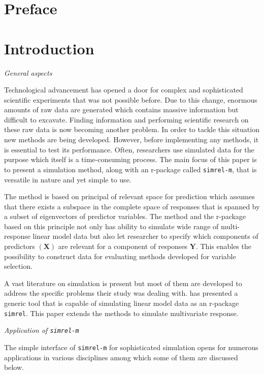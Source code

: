 \documentclass[12pt,a4paperpaper,authoryear]{elsarticle} %
\begin{document}
\section*{Preface}\label{preface}

\section{Introduction}\label{introduction}

\emph{General aspects}

Technological advancement has opened a door for complex and
sophisticated scientific experiments that was not possible before. Due
to this change, enormous amounts of raw data are generated which
contains massive information but difficult to excavate. Finding
information and performing scientific research on these raw data is now
becoming another problem. In order to tackle this situation new methods
are being developed. However, before implementing any methods, it is
essential to test its performance. Often, researchers use simulated data
for the purpose which itself is a time-consuming process. The main focus
of this paper is to present a simulation method, along with an r-package
called \texttt{simrel-m}, that is versatile in nature and yet simple to
use.

The method is based on principal of relevant space for prediction which
assumes that there exists a subspace in the complete space of responses
that is spanned by a subset of eigenvectors of predictor variables. The
method and the r-package based on this principle not only has ability to
simulate wide range of multi-response linear model data but also let
researcher to specify which components of predictors \((\mathbf{X})\)
are relevant for a component of responses \(\mathbf{Y}\). This enables
the possibility to construct data for evaluating methods developed for
variable selection.

A vast literature on simulation is present but most of them are
developed to address the specific problems their study was dealing with.
\citet{saebo2015simrel} has presented a generic tool that is capable of
simulating linear model data as an r-package \texttt{simrel}. This paper
extends the methods to simulate multivariate response.

\emph{Application of \texttt{simrel-m}}

The simple interface of \texttt{simrel-m} for sophisticated simulation
opens for numerous applications in various disciplines among which some
of them are discussed below.
\end{document}
